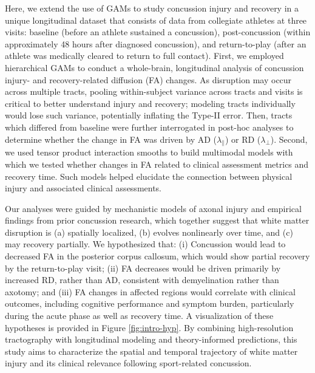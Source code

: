 \documentclass[12pt]{article}
\begin{document}
Here, we extend the use of GAMs to study concussion injury and recovery in a unique longitudinal dataset that consists of data from collegiate athletes at three visits: baseline (before an athlete sustained a concussion), post-concussion (within approximately 48 hours after diagnosed concussion), and return-to-play (after an athlete was medically cleared to return to full contact). First, we employed hierarchical GAMs to conduct a whole-brain, longitudinal analysis of concussion injury- and recovery-related diffusion (FA) changes. As disruption may occur across multiple tracts, pooling within-subject variance across tracts and visits is critical to better understand injury and recovery; modeling tracts individually would lose such variance, potentially inflating the Type-II error. Then, tracts which differed from baseline were further interrogated in post-hoc analyses to determine whether the change in FA was driven by AD ($\lambda_\parallel$) or RD ($\lambda_\perp$). Second, we used tensor product interaction smooths to build multimodal models with which we tested whether changes in FA related to clinical assessment metrics and recovery time. Such models helped elucidate the connection between physical injury and associated clinical assessments.

Our analyses were guided by mechanistic models of axonal injury and empirical findings from prior concussion research, which together suggest that white matter disruption is (a) spatially localized, (b) evolves nonlinearly over time, and (c) may recovery partially. We hypothesized that: (i) Concussion would lead to decreased FA in the posterior corpus callosum, which would show partial recovery by the return-to-play visit; (ii) FA decreases would be driven primarily by increased RD, rather than AD, consistent with demyelination rather than axotomy; and (iii) FA changes in affected regions would correlate with clinical outcomes, including cognitive performance and symptom burden, particularly during the acute phase as well as recovery time. A visualization of these hypotheses is provided in Figure \ref{fig:intro-hyp}. By combining high-resolution tractography with longitudinal modeling and theory-informed predictions, this study aims to characterize the spatial and temporal trajectory of white matter injury and its clinical relevance following sport-related concussion.
\end{document}
